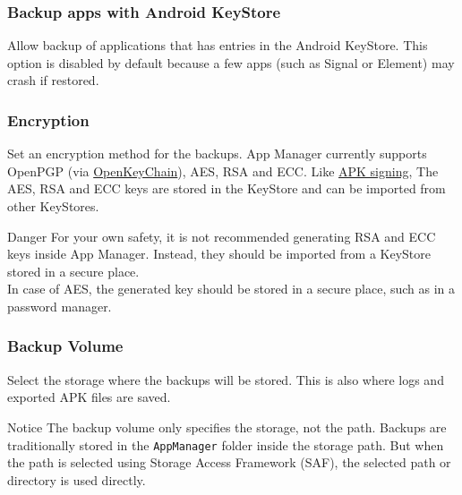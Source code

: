 
\subsubsection{Backup apps with Android KeyStore} %
Allow backup of applications that has entries in the Android KeyStore. This option is disabled by
default because a few apps (such as Signal or Element) may crash if restored.

\subsubsection{Encryption}\label{subsubsec:settings-encryption} %
Set an encryption method for the backups. App Manager currently supports OpenPGP (via
\href{https://f-droid.org/packages/org.sufficientlysecure.keychain/}{OpenKeyChain}), AES, RSA and ECC\@.
Like \hyperref[subsec:apk-signing]{APK signing}, The AES, RSA and ECC keys are stored in the
KeyStore and can be imported from other KeyStores.

\begin{danger}{Danger}
    For your own safety, it is not recommended generating RSA and ECC keys inside App Manager.
    Instead, they should be imported from a KeyStore stored in a secure place.\\
    In case of AES, the generated key should be stored in a secure place, such as in a password manager.
\end{danger}

\subsubsection{Backup Volume}\label{subsubsec:backup-volume} %
Select the storage where the backups will be stored. This is also where logs and exported APK files are saved.

\begin{tip}{Notice}
    The backup volume only specifies the storage, not the path. Backups are traditionally stored in the \texttt{AppManager} folder inside the storage path.
    But when the path is selected using Storage Access Framework (SAF), the selected path or directory is used directly.
\end{tip}

